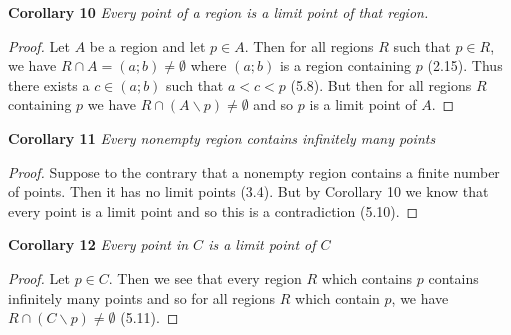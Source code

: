 \documentclass{article}
\begin{document}
\begin{flushleft}
\textbf{Corollary 10}
\textsl{Every point of a region is a limit point of that region.}
\begin{proof}
Let $A$ be a region and let $p \in A$. Then for all regions $R$ such that $p \in R$, we have $R \cap A = (a;b) \neq \emptyset$ where $(a;b)$ is a region containing $p$ (2.15). Thus there exists a $c \in (a;b)$ such that $a<c<p$ (5.8). But then for all regions $R$ containing $p$ we have $R \cap (A \backslash p) \neq \emptyset$ and so $p$ is a limit point of $A$.
\end{proof}

\textbf{Corollary 11}
\textsl{Every nonempty region contains infinitely many points}
\begin{proof}
Suppose to the contrary that a nonempty region contains a finite number of points. Then it has no limit points (3.4). But by Corollary 10 we know that every point is a limit point and so this is a contradiction (5.10).
\end{proof}

\textbf{Corollary 12}
\textsl{Every point in $C$ is a limit point of $C$}
\begin{proof}
Let $p \in C$. Then we see that every region $R$ which contains $p$ contains infinitely many points and so for all regions $R$ which contain $p$, we have $R \cap (C \backslash p) \neq \emptyset$ (5.11).
\end{proof}

\end{flushleft}
\end{document}
